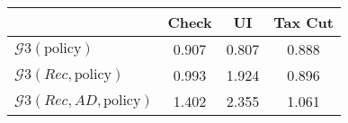 \begin{tabular}{@{}lccc@{}} 
\toprule 
                          & Check      & UI    & Tax Cut    \\  \midrule 
$\mathcal{G}3(\text{policy})$ & 0.907  & 0.807  & 0.888     \\ 
$\mathcal{G}3(Rec,\text{policy})$ & 0.993  & 1.924  & 0.896     \\ 
$\mathcal{G}3(Rec, AD,\text{policy})$ & 1.402  & 2.355  & 1.061     \\ 
\end{tabular}  
